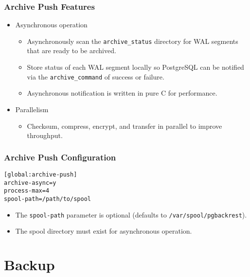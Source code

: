 \begin{frame}
    \frametitle{Archive Push Features}

    \begin{itemize}
        \item Asynchronous operation

        \begin{itemize}
            \item Asynchronously scan the \texttt{archive\_status} directory for WAL segments that are ready to be archived.\pause
            \item Store status of each WAL segment locally so PostgreSQL can be notified via the \texttt{archive\_command} of success or failure.\pause
            \item Asynchronous notification is written in pure C for performance.
        \end{itemize}

        \item Parallelism

        \begin{itemize}
            \item Checksum, compress, encrypt, and transfer in parallel to improve throughput.
        \end{itemize}
    \end{itemize}
\end{frame}

\begin{frame}[fragile]
    \frametitle{Archive Push Configuration}

    \vspace{.75em}\begin{lstlisting}[title=pgbackrest.conf]
[global:archive-push]
archive-async=y
process-max=4
spool-path=/path/to/spool
    \end{lstlisting}\pause\vspace{1em}

    \begin{itemize}
        \item The \texttt{spool-path} parameter is optional (defaults to \texttt{/var/spool/pgbackrest}).\pause
        \item The spool directory must exist for asynchronous operation.
    \end{itemize}
\end{frame}

\section{Backup}

